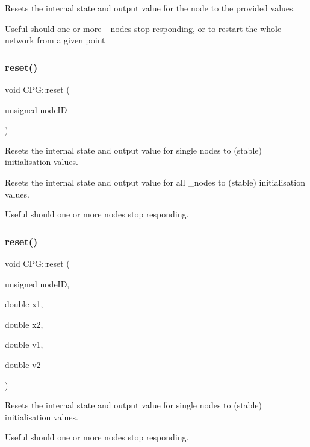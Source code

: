 Resets the internal state and output value for the node to the provided values. 

Useful should one or more \+\_\+nodes stop responding, or to restart the whole network from a given point \mbox{\label{classCPG_a0582af7d0c19f80453c9ce72d918e577}} 
\subsubsection{\texorpdfstring{reset()}{reset()}\hspace{0.1cm}{\footnotesize\ttfamily [3/4]}}
{\footnotesize\ttfamily void C\+P\+G\+::reset (\begin{DoxyParamCaption}\item[{unsigned}]{node\+ID }\end{DoxyParamCaption})}



Resets the internal state and output value for single nodes to (stable) initialisation values. 

Resets the internal state and output value for all \+\_\+nodes to (stable) initialisation values.

Useful should one or more nodes stop responding. \mbox{\label{classCPG_a71a46a6aeac8fa3f1363674be5f0db81}} 
\subsubsection{\texorpdfstring{reset()}{reset()}\hspace{0.1cm}{\footnotesize\ttfamily [4/4]}}
{\footnotesize\ttfamily void C\+P\+G\+::reset (\begin{DoxyParamCaption}\item[{unsigned}]{node\+ID,  }\item[{double}]{x1,  }\item[{double}]{x2,  }\item[{double}]{v1,  }\item[{double}]{v2 }\end{DoxyParamCaption})}



Resets the internal state and output value for single nodes to (stable) initialisation values. 

Useful should one or more nodes stop responding. \mbox{\label{classCPG_a8523c6ee51d46aad0bd07c45090e8de3}} 
